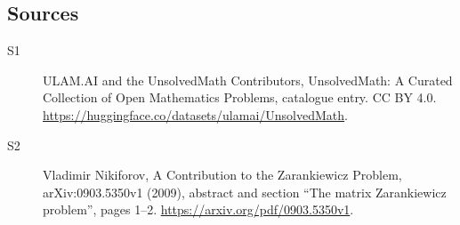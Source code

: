 \documentclass[11pt]{article}
\begin{document}
\subsection{Sources}
\begin{description}
\item[\hypertarget{source:statement:1}{S1}] ULAM.AI and the UnsolvedMath Contributors, UnsolvedMath: A Curated Collection of Open Mathematics Problems, catalogue entry. CC BY 4.0. \url{https://huggingface.co/datasets/ulamai/UnsolvedMath}.
\item[\hypertarget{source:statement:2}{S2}] Vladimir Nikiforov, A Contribution to the Zarankiewicz Problem, arXiv:0903.5350v1 (2009), abstract and section “The matrix Zarankiewicz problem”, pages 1--2. \url{https://arxiv.org/pdf/0903.5350v1}.
\end{description}
\label{end:statement}
\end{document}
